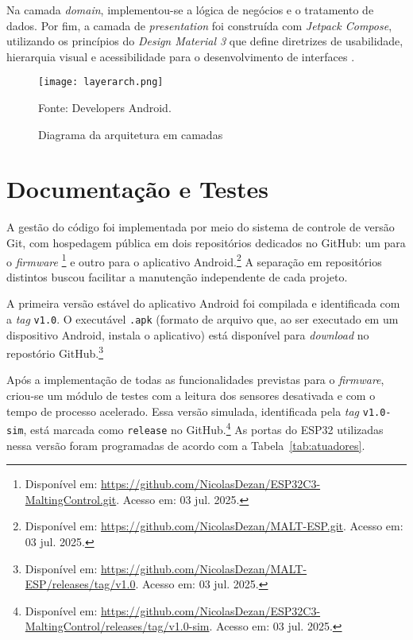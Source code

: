 Na camada \textit{domain}, implementou-se a lógica de negócios e o tratamento de dados. Por fim, a camada de \textit{presentation} foi construída com \textit{Jetpack Compose}, utilizando os princípios do \textit{Design Material 3} que define diretrizes de usabilidade, hierarquia visual e acessibilidade para o desenvolvimento de interfaces \cite{material3}.

\begin{figure}[ht]
    \centering
    \caption{Diagrama da arquitetura em camadas}
    \label{fig:layerarch}
    \texttt{[image: layerarch.png]}

    {\centering\footnotesize Fonte: Developers Android.\par}
\end{figure}

\section{Documentação e Testes}
A gestão do código foi implementada por meio do sistema de controle de versão Git, com hospedagem pública em dois repositórios dedicados no GitHub: um para o \textit{firmware} \footnote{Disponível em: \url{https://github.com/NicolasDezan/ESP32C3-MaltingControl.git}. Acesso em: 03 jul. 2025.} e outro para o aplicativo Android.\footnote{Disponível em: \url{https://github.com/NicolasDezan/MALT-ESP.git}. Acesso em: 03 jul. 2025.} A separação em repositórios distintos buscou facilitar a manutenção independente de cada projeto.

A primeira versão estável do aplicativo Android foi compilada e identificada com a \textit{tag} \texttt{v1.0}. O executável \texttt{.apk} (formato de arquivo que, ao ser executado em um dispositivo Android, instala o aplicativo) está disponível para \textit{download} no repostório GitHub.\footnote{Disponível em: \url{https://github.com/NicolasDezan/MALT-ESP/releases/tag/v1.0}. Acesso em: 03 jul. 2025.}

Após a implementação de todas as funcionalidades previstas para o \textit{firmware}, criou-se um módulo de testes com a leitura dos sensores desativada e com o tempo de processo acelerado. Essa versão simulada, identificada pela \textit{tag} \texttt{v1.0-sim}, está marcada como \texttt{release} no GitHub.\footnote{Disponível em: \url{https://github.com/NicolasDezan/ESP32C3-MaltingControl/releases/tag/v1.0-sim}. Acesso em: 03 jul. 2025.} As portas do ESP32 utilizadas nessa versão foram programadas de acordo com a Tabela~\ref{tab:atuadores}.

